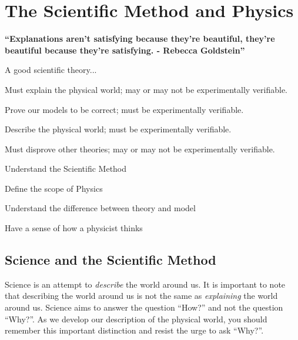 %
\chapter{The Scientific Method and Physics}
\label{Introduction}

\textbf{``Explanations aren't satisfying because they're beautiful, they're beautiful because they're satisfying. - Rebecca Goldstein''}

\begin{openingMC}{A good scientific theory...}
\item Must explain the physical world; may or may not be experimentally verifiable.
\item Prove our models to be correct; must be experimentally verifiable.
\item Describe the physical world; must be experimentally verifiable.
\item Must disprove other theories; may or may not be experimentally verifiable.
\end{openingMC}
\vspace{0.5cm}
\begin{learningObjectives}
\item Understand the Scientific Method
\item Define the scope of Physics
\item Understand the difference between theory and model
\item Have a sense of how a physicist thinks
\end{learningObjectives}

\section{Science and the Scientific Method}
Science is an attempt to \textit{describe} the world around us. It is important to note that describing the world around us is not the same as \textit{explaining} the world around us. Science aims to answer the question ``How?'' and not the question ``Why?''. As we develop our description of the physical world, you should remember this important distinction and resist the urge to ask ``Why?''.

